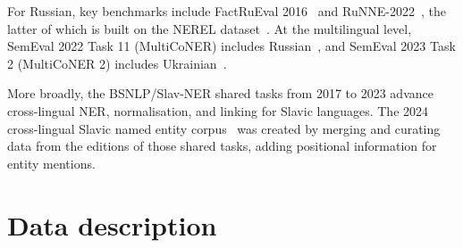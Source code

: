 \documentclass{article}
\begin{document}
For Russian, key benchmarks include FactRuEval 2016~\parencite{as2016factrueval} and RuNNE-2022~\parencite{artemova2022runne}, the latter of which is built on the NEREL dataset~\parencite{loukachevitch-etal-2021-nerel}. 
At the multilingual level, SemEval 2022 Task 11 (MultiCoNER) includes Russian~\parencite{malmasi2022semeval}, and SemEval 2023 Task 2 (MultiCoNER 2) includes Ukrainian~\parencite{fetahu2023semeval}.

More broadly, the BSNLP/Slav-NER shared tasks from 2017 to 2023 advance cross-lingual NER, normalisation, and linking for Slavic languages. 
The 2024 cross-lingual Slavic named entity corpus~\parencite{piskorski-etal-2024-cross} was created by merging and curating data from the \textcite{piskorski-etal-2017-first, piskorski-etal-2019-second, piskorski-etal-2021-slav, yangarber-etal-2023-slav} editions of those shared tasks, adding positional information for entity mentions.

\section{Data description}
\label{sec:data}
\end{document}
